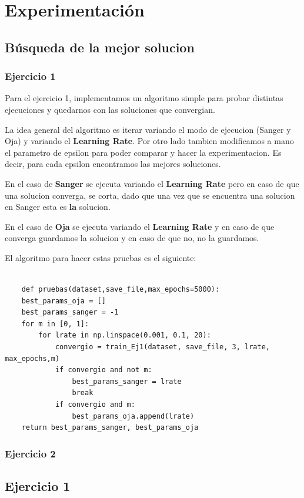 \section{Experimentación}
\subsection{Búsqueda de la mejor solucion}

\subsubsection{Ejercicio 1}
Para el ejercicio 1, implementamos un algoritmo simple para probar distintas ejecuciones y quedarnos con las soluciones que convergian. 

La idea general del algoritmo es iterar variando el modo de ejecucion (Sanger y Oja) y variando el \textbf{Learning Rate}. Por otro lado tambien modificamos a mano el parametro de epsilon para poder comparar y hacer la experimentacion. Es decir, para cada epsilon encontramos las mejores soluciones.

En el caso de \textbf{Sanger} se ejecuta variando el \textbf{Learning Rate} pero en caso de que una solucion converga, se corta, dado que una vez que se encuentra una solucion en Sanger esta es \textbf{la} solucion.

En el caso de \textbf{Oja} se ejecuta variando el \textbf{Learning Rate} y en caso de que converga guardamos la solucion y en caso de que no, no la guardamos.

El algoritmo para hacer estas pruebas es el siguiente:


\begin{lstlisting}[caption=pruebas]
	
	def pruebas(dataset,save_file,max_epochs=5000):
	best_params_oja = []
	best_params_sanger = -1
	for m in [0, 1]:
		for lrate in np.linspace(0.001, 0.1, 20):
			convergio = train_Ej1(dataset, save_file, 3, lrate, max_epochs,m)
			if convergio and not m:
				best_params_sanger = lrate
				break
			if convergio and m:
				best_params_oja.append(lrate)
	return best_params_sanger, best_params_oja

\end{lstlisting}

\subsubsection{Ejercicio 2}

\subsection{Ejercicio 1}


